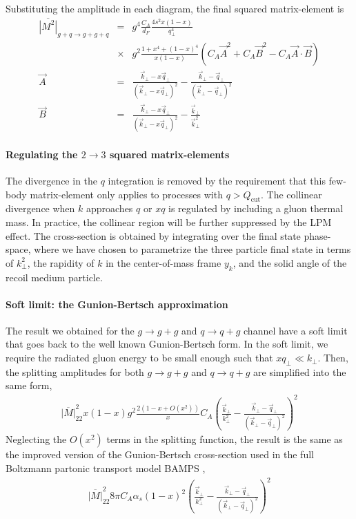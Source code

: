 \begin{appendices}
Substituting the amplitude in each diagram, the final squared matrix-element is 
\begin{eqnarray}
\label{eq:gq2ggq}
\overline{|M^2|}_{g+q\rightarrow g+g+q} &=&
g^4 \frac{C_A}{d_F}\frac{4s^2x(1-x)}{q_\perp^4} \\\nonumber
&\times&g^2\frac{1+x^4+(1-x)^4}{x(1-x)}   
\left(C_A\vec{A}^2 + C_A\vec{B}^2 - C_A\vec{A}\cdot\vec{B}\right)\\
\vec{A} &=& \frac{\vec{k}_\perp - x\vec{q}_\perp}{(\vec{k}_\perp - x\vec{q}_\perp)^2} -  \frac{\vec{k}_\perp - \vec{q}_\perp}{(\vec{k}_\perp - \vec{q}_\perp)^2} \\
\vec{B} &=& \frac{\vec{k}_\perp - x\vec{q}_\perp}{(\vec{k}_\perp - x\vec{q}_\perp)^2} -  \frac{\vec{k}_\perp}{\vec{k}_\perp^2}
\end{eqnarray}

\paragraph{Regulating the $2\rightarrow 3$ squared matrix-elements}
The divergence in the $q$ integration is removed by the requirement that this few-body matrix-element only applies to processes with $q>Q_{\textrm{cut}}$.
The collinear divergence when $k$ approaches $q$ or $xq$ is regulated by including a gluon thermal mass. 
In practice, the collinear region will be further suppressed by the LPM effect.
The cross-section is obtained by integrating over the final state phase-space, where we have chosen to parametrize the three particle final state in terms of $k_\perp^2$, the rapidity of $k$ in the center-of-mass frame $y_k$, and the solid angle of the recoil medium particle.

\paragraph{Soft limit: the Gunion-Bertsch approximation}
The result we obtained for the $g\rightarrow g+g$ and $q\rightarrow q+g$ channel have a soft limit that goes back to the well known Gunion-Bertsch form. 
In the soft limit, we require the radiated gluon energy to be small enough such that $xq_\perp \ll k_\perp$.
Then, the splitting amplitudes for both $g\rightarrow g+g$ and  $q\rightarrow q+g$ are simplified into the same form,
\begin{eqnarray}
\overline{|M|}^2_{22} x(1-x)g^2 \frac{2(1-x+O(x^2))}{x} C_A \left(\frac{\vec{k}_\perp}{k_\perp^2}-\frac{\vec{k}_\perp-\vec{q}_\perp}{(\vec{k}_\perp-\vec{q}_\perp)^2}\right)^2
\end{eqnarray}
Neglecting the $O(x^2)$ terms in the splitting function, the result is the same as the improved version of the Gunion-Bertsch cross-section \cite{Fochler:2013epa} used in the full Boltzmann partonic transport model BAMPS \cite{Xu:2004mz},
\begin{eqnarray}
\overline{|M|}^2_{22} 8\pi C_A\alpha_s (1-x)^2 \left(\frac{\vec{k}_\perp}{k_\perp^2}-\frac{\vec{k}_\perp-\vec{q}_\perp}{(\vec{k}_\perp-\vec{q}_\perp)^2}\right)^2
\end{eqnarray}


\end{appendices}
